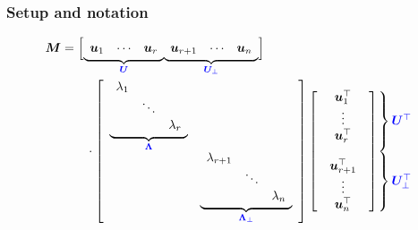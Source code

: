 \documentclass[compress,
mathserif,wide,%
]{beamer}
\begin{document}
\begin{frame}
\frametitle{Setup and notation}



{\small
\begin{align*}
\bm{M} & =\Big[\underset{\textcolor{blue}{ \bm{U}}}{\underbrace{\begin{array}{ccc}
\bm{u}_{1} & \cdots & \bm{u}_{r}\end{array}}}\underset{\textcolor{blue}{ \bm{U}_{\perp}}}{\underbrace{\begin{array}{ccc}
\bm{u}_{r+1} & \cdots & \bm{u}_{n}\end{array}}}\Big]\\
 & \qquad\cdot \left[\begin{array}{cc}
\underset{\textcolor{blue}{ \bm{\Lambda}}}{\underbrace{\begin{array}{ccc}
\lambda_{1}\\
 & \ddots\\
 &  & \lambda_{r}
\end{array}}}\\
 & \underset{\textcolor{blue}{ \bm{\Lambda}_{\perp}}}{\underbrace{\begin{array}{ccc}
\lambda_{r+1}\\
 & \ddots\\
 &  & \lambda_{n}
\end{array}}}
\end{array}\right]\left[\begin{array}{c}
\begin{array}{c}
\bm{u}_{1}^{\top}\\
\vdots\\
\bm{u}_{r}^{\top}
\end{array}\\
\begin{array}{c}
\\
\bm{u}_{r+1}^{\top}\\
\vdots\\
\bm{u}_{n}^{\top}
\end{array}
\end{array}\right]
\hspace{-1.7em}\begin{array}{c}
\left.\begin{array}{c}
\\
\\
\\
\\
\end{array}\right\} \textcolor{blue}{ \bm{U}^{\top}}\\
\left.\begin{array}{c}
\\
\\
\\
\\
\end{array}\right\} \textcolor{blue}{ \bm{U}_{\perp}^{\top}}
\end{array}
\end{align*}


}

\end{frame}
\end{document}
